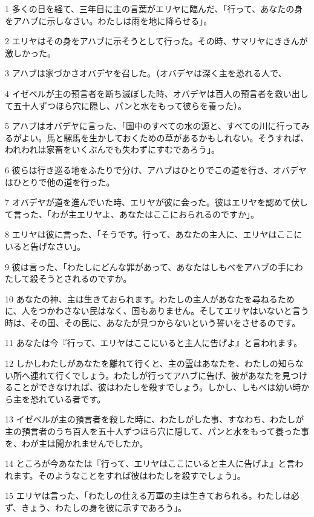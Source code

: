 \par 1 多くの日を経て、三年目に主の言葉がエリヤに臨んだ、「行って、あなたの身をアハブに示しなさい。わたしは雨を地に降らせる」。
\par 2 エリヤはその身をアハブに示そうとして行った。その時、サマリヤにききんが激しかった。
\par 3 アハブは家づかさオバデヤを召した。（オバデヤは深く主を恐れる人で、
\par 4 イゼベルが主の預言者を断ち滅ぼした時、オバデヤは百人の預言者を救い出して五十人ずつほら穴に隠し、パンと水をもって彼らを養った）。
\par 5 アハブはオバデヤに言った、「国中のすべての水の源と、すべての川に行ってみるがよい。馬と騾馬を生かしておくための草があるかもしれない。そうすれば、われわれは家畜をいくぶんでも失わずにすむであろう」。
\par 6 彼らは行き巡る地をふたりで分け、アハブはひとりでこの道を行き、オバデヤはひとりで他の道を行った。
\par 7 オバデヤが道を進んでいた時、エリヤが彼に会った。彼はエリヤを認めて伏して言った、「わが主エリヤよ、あなたはここにおられるのですか」。
\par 8 エリヤは彼に言った、「そうです。行って、あなたの主人に、エリヤはここにいると告げなさい」。
\par 9 彼は言った、「わたしにどんな罪があって、あなたはしもべをアハブの手にわたして殺そうとされるのですか。
\par 10 あなたの神、主は生きておられます。わたしの主人があなたを尋ねるために、人をつかわさない民はなく、国もありません。そしてエリヤはいないと言う時は、その国、その民に、あなたが見つからないという誓いをさせるのです。
\par 11 あなたは今『行って、エリヤはここにいると主人に告げよ』と言われます。
\par 12 しかしわたしがあなたを離れて行くと、主の霊はあなたを、わたしの知らない所へ連れて行くでしょう。わたしが行ってアハブに告げ、彼があなたを見つけることができなければ、彼はわたしを殺すでしょう。しかし、しもべは幼い時から主を恐れている者です。
\par 13 イゼベルが主の預言者を殺した時に、わたしがした事、すなわち、わたしが主の預言者のうち百人を五十人ずつほら穴に隠して、パンと水をもって養った事を、わが主は聞かれませんでしたか。
\par 14 ところが今あなたは『行って、エリヤはここにいると主人に告げよ』と言われます。そのようなことをすれば彼はわたしを殺すでしょう」。
\par 15 エリヤは言った、「わたしの仕える万軍の主は生きておられる。わたしは必ず、きょう、わたしの身を彼に示すであろう」。
